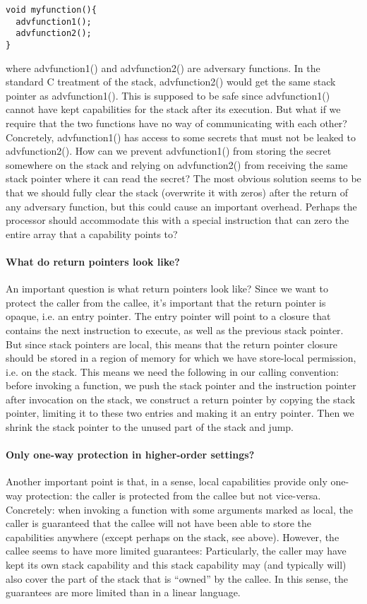 \documentclass[a4paper]{article}
\begin{document}
\begin{verbatim}
void myfunction(){
  advfunction1();
  advfunction2();
}
\end{verbatim}

where advfunction1() and advfunction2() are adversary functions. In the standard
C treatment of the stack, advfunction2() would get the same stack pointer as
advfunction1(). This is supposed to be safe since advfunction1() cannot have
kept capabilities for the stack after its execution. But what if we require that
the two functions have no way of communicating with each other? Concretely,
advfunction1() has access to some secrets that must not be leaked to
advfunction2(). How can we prevent advfunction1() from storing the secret
somewhere on the stack and relying on advfunction2() from receiving the same
stack pointer where it can read the secret? The most obvious solution seems to
be that we should fully clear the stack (overwrite it with zeros) after the
return of any adversary function, but this could cause an important overhead.
Perhaps the processor should accommodate this with a special instruction that can
zero the entire array that a capability points to?

\paragraph{What do return pointers look like?}
An important question is what return pointers look like? Since we want to
protect the caller from the callee, it's important that the return pointer is
opaque, i.e. an entry pointer. The entry pointer will point to a closure that
contains the next instruction to execute, as well as the previous stack pointer.
But since stack pointers are local, this means that the return pointer closure
should be stored in a region of memory for which we have store-local permission,
i.e. on the stack. This means we need the following in our calling convention:
before invoking a function, we push the stack pointer and the instruction
pointer after invocation on the stack, we construct a return pointer by
copying the stack pointer, limiting it to these two entries and making it an
entry pointer.  Then we shrink the stack pointer to the unused part of the stack
and jump. 

\paragraph{Only one-way protection in higher-order settings?}
Another important point is that, in a sense, local capabilities provide only
one-way protection: the caller is protected from the callee but not vice-versa.
Concretely: when invoking a function with some arguments marked as local, the
caller is guaranteed that the callee will not have been able to store the
capabilities anywhere (except perhaps on the stack, see above). However, the
callee seems to have more limited guarantees: Particularly, the caller may have
kept its own stack capability and this stack capability may (and typically will)
also cover the part of the stack that is ``owned'' by the callee.  In this
sense, the guarantees are more limited than in a linear language.
\end{document}
